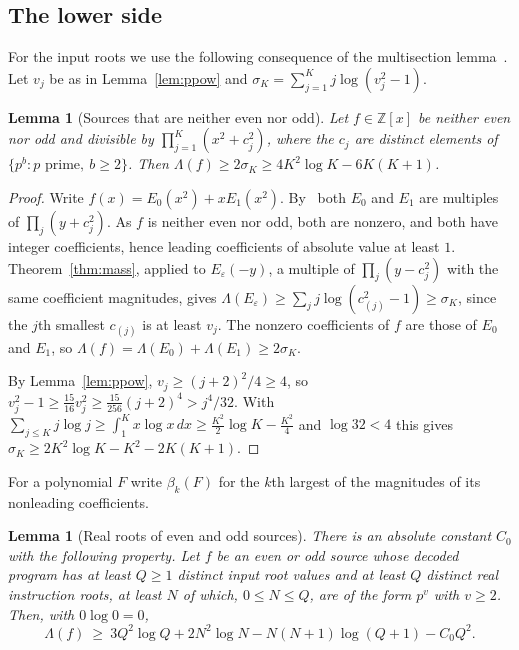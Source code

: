 \documentclass[11pt]{article}
\newtheorem{lemma}[theorem]{Lemma}
\theoremstyle{remark}
\newcommand{\Z}{\mathbb Z}
\begin{document}
\subsection{The lower side}\label{sec:const-lower}

For the input roots we use the following consequence of the multisection
lemma~\cite[Lemma~2.1]{coefficient-mass-complex}.  Let $v_j$ be as in Lemma~\ref{lem:ppow} and
$\sigma_K=\sum_{j=1}^Kj\log(v_j^2-1)$.

\begin{lemma}[Sources that are neither even nor odd]\label{rem:parity}
Let $f\in\Z[x]$ be neither even nor odd and divisible by $\prod_{j=1}^K(x^2+c_j^2)$, where
the $c_j$ are distinct elements of $\{p^b:p\text{ prime},\ b\ge2\}$.  Then
$\Lambda(f)\ge2\sigma_K\ge4K^2\log K-6K(K+1)$.
\end{lemma}

\begin{proof}
Write $f(x)=E_0(x^2)+xE_1(x^2)$.  By~\cite[Lemma~2.1]{coefficient-mass-complex} both $E_0$ and
$E_1$ are multiples of $\prod_j(y+c_j^2)$.  As $f$ is neither even nor odd, both are
nonzero, and both have integer coefficients, hence leading coefficients of absolute value
at least $1$.  Theorem~\ref{thm:mass}, applied to $E_\varepsilon(-y)$, a multiple of
$\prod_j(y-c_j^2)$ with the same coefficient magnitudes, gives
$\Lambda(E_\varepsilon)\ge\sum_jj\log(c_{(j)}^2-1)\ge\sigma_K$, since the $j$th smallest
$c_{(j)}$ is at least $v_j$.  The nonzero coefficients of $f$ are those of $E_0$ and $E_1$,
so $\Lambda(f)=\Lambda(E_0)+\Lambda(E_1)\ge2\sigma_K$.

By Lemma~\ref{lem:ppow}, $v_j\ge(j+2)^2/4\ge4$, so
$v_j^2-1\ge\frac{15}{16}v_j^2\ge\frac{15}{256}(j+2)^4>j^4/32$.  With
$\sum_{j\le K}j\log j\ge\int_1^Kx\log x\,dx\ge\frac{K^2}2\log K-\frac{K^2}4$ and
$\log32<4$ this gives $\sigma_K\ge2K^2\log K-K^2-2K(K+1)$.
\end{proof}

For a polynomial $F$ write $\beta_k(F)$ for the $k$th largest of the magnitudes of its
nonleading coefficients.

\begin{lemma}[Real roots of even and odd sources]\label{lem:evensigns}
There is an absolute constant $C_0$ with the following property.  Let $f$ be an even or odd
source whose decoded program has at least $Q\ge1$ distinct input root values and at least
$Q$ distinct real instruction roots, at least $N$ of which, $0\le N\le Q$, are of the form
$p^v$ with $v\ge2$.  Then, with $0\log0=0$,
\[
  \Lambda(f)\ \ge\ 3Q^2\log Q+2N^2\log N-N(N+1)\log(Q+1)-C_0Q^2 .
\]
\end{lemma}
\end{document}
